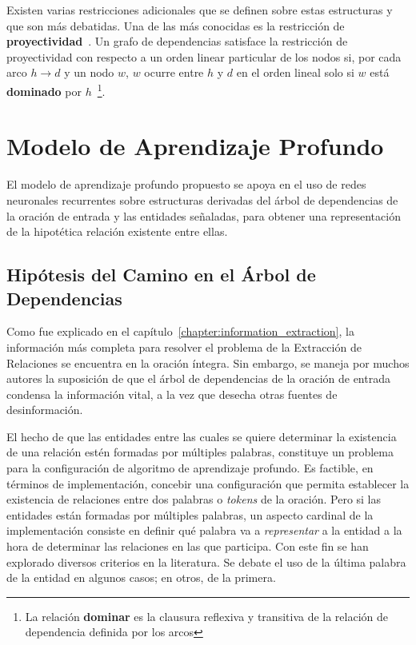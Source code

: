 Existen varias restricciones adicionales que se definen sobre estas estructuras y que son más debatidas.
Una de las más conocidas es la restricción de \textbf{proyectividad}~\cite{hays1964dependency,lecerf1960programme,marcus1965notion}.
Un grafo de dependencias satisface la restricción de proyectividad con respecto a un orden linear particular de los nodos si, por cada arco $h \rightarrow d$ y un nodo $w$, $w$ ocurre entre $h$ y $d$ en el orden lineal solo si $w$ está \textbf{dominado} por $h$~\footnote{La relación \textbf{dominar} es la clausura reflexiva y transitiva de la relación de dependencia definida por los arcos}. 

\section{Modelo de Aprendizaje Profundo}\label{sec:model}

El modelo de aprendizaje profundo propuesto se apoya en el uso de redes neuronales recurrentes sobre estructuras derivadas del árbol de dependencias de la oración de entrada y las entidades señaladas, para obtener una representación de la hipotética relación existente entre ellas.

\subsection{Hipótesis del Camino en el Árbol de Dependencias}

Como fue explicado en el capítulo~\ref{chapter:information_extraction}, la información más completa para resolver el problema de la Extracción de Relaciones se encuentra en la oración íntegra. Sin embargo, se maneja por muchos autores la suposición de que el árbol de dependencias de la oración de entrada condensa la información vital, a la vez que desecha otras fuentes de desinformación.

El hecho de que las entidades entre las cuales se quiere determinar la existencia de una relación estén formadas por múltiples palabras, constituye un problema para la configuración de algoritmo de aprendizaje profundo.
Es factible, en términos de implementación, concebir una configuración que permita establecer la existencia de relaciones entre dos palabras o \textit{tokens} de la oración.
Pero si las entidades están formadas por múltiples palabras, un aspecto cardinal de la implementación consiste en definir qué palabra va a \textit{representar} a la entidad a la hora de determinar las relaciones en las que participa.
Con este fin se han explorado diversos criterios en la literatura.
Se debate el uso de la última palabra de la entidad en algunos casos; en otros, de la primera.

